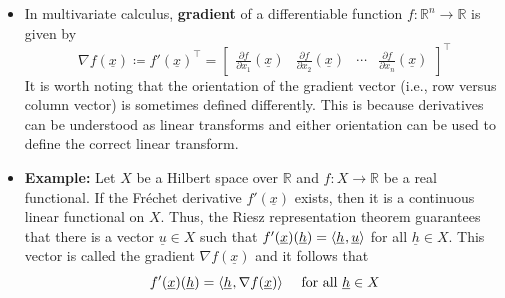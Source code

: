 \documentclass[11pt,twoside]{report}
\newcommand{\bbR}{{\mathbb{R}}}
\newcommand{\vecnot}{\underline}
\newcommand{\tinner}[2]{{\langle #1 \mskip1mu , #2 \rangle}}
\begin{document}
\begin{itemize}
\item In multivariate calculus, \textbf{gradient} of a differentiable function $f\colon \bbR^n \to \bbR$ %
is given by 
\[
 \nabla f(\vecnot{x}) \coloneqq  f'(\vecnot{x})^\top  = \left[ \begin{array}{cccc} \frac{\partial  f}{\partial  x_1} (\vecnot{x}) & \frac{\partial  f}{\partial  x_2} (\vecnot{x}) & \cdots & \frac{\partial  f}{\partial  x_n} (\vecnot{x}) \end{array} \right]^\top
  \]
It is worth noting that the orientation of the gradient vector (i.e., row versus column vector) is sometimes defined differently.
This is because derivatives can be understood as linear transforms and either orientation can be used to define the correct linear transform. 

\item \textbf{Example:} Let $X$ be a Hilbert space over $\bbR$ and $f\colon X \to \bbR$ be a real functional.
If the Fr\'{e}chet derivative $f'(\vecnot{x})$ exists, then it is a continuous linear functional on $X$.
Thus, the Riesz representation theorem guarantees that there is a vector $\vecnot{u} \in X$ such that
$ f'(\vecnot{x})(\vecnot{h}) = \tinner{\vecnot{h} }{ \vecnot{u} } $ for all $\vecnot{h}\in X$.
This vector is called the gradient $\nabla f(\vecnot{x})$ and it follows that
\[
 f'(\vecnot{x})(\vecnot{h}) = \tinner{\vecnot{h} }{ \nabla f (\vecnot{x}) } \quad  \text{ for all } \vecnot{h}\in X
\]



\end{itemize}
\end{document}
